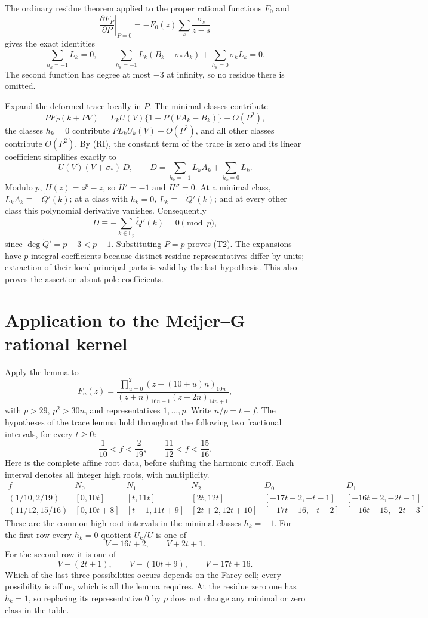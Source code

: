 The ordinary residue theorem applied to the proper rational functions
$F_0$ and
\[
 \left.\frac{\partial F_P}{\partial P}\right|_{P=0}
       =-F_0(z)\sum_s\frac{\sigma_s}{z-s}
\]
gives the exact identities
\[
 \sum_{h_k=-1}L_k=0,\qquad
 \sum_{h_k=-1}L_k(B_k+\sigma_*A_k)
       +\sum_{h_k=0}\sigma_kL_k=0.                    \tag{RI}
\]
The second function has degree at most $-3$ at infinity, so no residue
there is omitted.

Expand the deformed trace locally in $P$.  The minimal classes contribute
\[
 P F_P(k+PV)=L_kU(V)\{1+P(VA_k-B_k)\}+O(P^2),
\]
the classes $h_k=0$ contribute $P L_kU_k(V)+O(P^2)$, and all other classes
contribute $O(P^2)$.  By (RI), the constant term of the trace is zero and
its linear coefficient simplifies exactly to
\[
 U(V)(V+\sigma_*)\,D,\qquad
 D=\sum_{h_k=-1}L_kA_k+\sum_{h_k=0}L_k.                 \tag{D}
\]
Modulo $p$, $H(z)=z^p-z$, so $H'=-1$ and $H''=0$.
At a minimal class, $L_kA_k\equiv-\widetilde Q'(k)$; at a class with
$h_k=0$, $L_k\equiv-\widetilde Q'(k)$; and at every other class this
polynomial derivative vanishes.  Consequently
\[
 D\equiv-\sum_{k\in\mathbb F_p}\widetilde Q'(k)=0\pmod p,
\]
since $\deg\widetilde Q'=p-3<p-1$.
Substituting $P=p$ proves (T2).  The expansions have $p$-integral
coefficients because distinct residue representatives differ by units;
extraction of their local principal parts is valid by the last hypothesis.
This also proves the assertion about pole coefficients.

\section{Application to the Meijer--G rational kernel}
Apply the lemma to
\[
 F_n(z)=\frac{\prod_{u=0}^2(z-(10+u)n)_{10n}}
                  {(z+n)_{16n+1}(z+2n)_{14n+1}},
\]
with $p>29$, $p^2>30n$, and representatives $1,\ldots,p$.
Write $n/p=t+f$.  The hypotheses of the trace lemma hold throughout the
following two fractional intervals, for every $t\ge0$:
\[
              \frac1{10}<f<\frac2{19},\qquad
              \frac{11}{12}<f<\frac{15}{16}.           \tag{S2}
\]
Here is the complete affine root data, before shifting the harmonic
cutoff.  Each interval denotes all integer high roots, with multiplicity.
\begingroup\small\setlength{\arraycolsep}{3.5pt}
\[
\begin{array}{c|ccc|cc}
 f&N_0&N_1&N_2&D_0&D_1\\\hline
 (1/10,2/19)
 &[0,10t]&[t,11t]&[2t,12t]
 &[-17t-2,-t-1]&[-16t-2,-2t-1]\\
 (11/12,15/16)
 &[0,10t+8]&[t+1,11t+9]&[2t+2,12t+10]
 &[-17t-16,-t-2]&[-16t-15,-2t-3]
\end{array}
\]
\endgroup
These are the common high-root intervals in the minimal classes
$h_k=-1$.  For the first row every $h_k=0$ quotient $U_k/U$ is one of
\[
                    V+16t+2,\qquad V+2t+1.
\]
For the second row it is one of
\[
                    V-(2t+1),\qquad V-(10t+9),\qquad V+17t+16.
\]
Which of the last three possibilities occurs depends on the Farey cell;
every possibility is affine, which is all the lemma requires.
At the residue zero one has $h_k=1$, so replacing its representative $0$
by $p$ does not change any minimal or zero class in the table.

